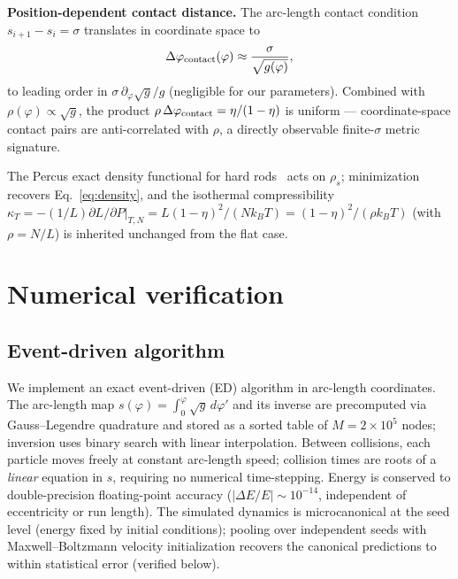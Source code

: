 \documentclass[aps,pre,twocolumn,superscriptaddress,longbibliography,floatfix]{revtex4-2}
\begin{document}
\textbf{Position-dependent contact distance.}
The arc-length contact condition $s_{i+1}-s_i=\sigma$ translates in coordinate space to
\begin{equation}
  \Delta\varphi_{\rm contact}(\varphi) \approx \frac{\sigma}{\sqrt{g(\varphi)}},
  \label{eq:contact_distance}
\end{equation}
to leading order in $\sigma\,\partial_\varphi\!\sqrt{g}/g$ (negligible for our parameters).
Combined with $\rho(\varphi)\propto\sqrt{g}$, the product
$\rho\,\Delta\varphi_{\rm contact}=\eta/(1-\eta)$ is uniform — coordinate-space contact pairs
are anti-correlated with $\rho$, a directly observable finite-$\sigma$ metric signature.

The Percus exact density functional for hard rods~\cite{Percus1976} acts on $\rho_s$; minimization recovers Eq.~\eqref{eq:density}, and the isothermal compressibility
$\kappa_T=-(1/L)\partial L/\partial P|_{T,N}=L(1-\eta)^2/(N k_BT)=(1-\eta)^2/(\rho k_BT)$
(with $\rho=N/L$) is inherited unchanged from the flat case.

\section{Numerical verification}
\label{sec:numerics}

\subsection{Event-driven algorithm}

We implement an exact event-driven (ED) algorithm in arc-length coordinates.
The arc-length map $s(\varphi)=\int_0^\varphi\!\sqrt{g}\,d\varphi'$ and its inverse are
precomputed via Gauss--Legendre quadrature and stored as a sorted table of $M=2\times 10^5$
nodes; inversion uses binary search with linear interpolation.
Between collisions, each particle moves freely at constant arc-length speed; collision times
are roots of a \emph{linear} equation in $s$, requiring no numerical time-stepping.
Energy is conserved to double-precision floating-point accuracy
($|\Delta E/E|\sim 10^{-14}$, independent of eccentricity or run length).
The simulated dynamics is microcanonical at the seed level (energy fixed by initial
conditions); pooling over independent seeds with Maxwell--Boltzmann velocity initialization
recovers the canonical predictions to within statistical error (verified below).
\end{document}

